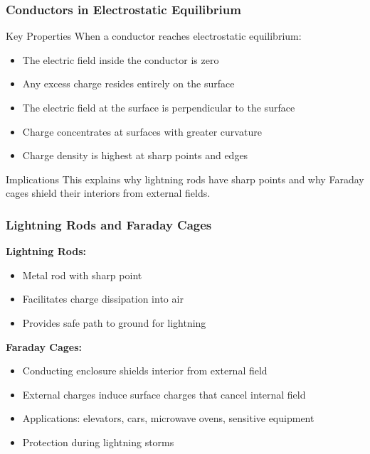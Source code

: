 \documentclass{beamer}
\newcommand{\highlight}[1]{\textcolor{ds9red}{#1}}
\begin{document}
\begin{frame}
    \frametitle{Conductors in Electrostatic Equilibrium}
    
    \begin{block}{Key Properties}
        When a conductor reaches electrostatic equilibrium:
    \end{block}
    
    \begin{itemize}
        \item The electric field \highlight{inside} the conductor is \highlight{zero}
        \item Any excess charge resides \highlight{entirely on the surface}
        \item The electric field at the surface is \highlight{perpendicular} to the surface
        \item Charge concentrates at surfaces with greater \highlight{curvature}
        \item Charge density is highest at \highlight{sharp points} and edges
    \end{itemize}
    
    \begin{alertblock}{Implications}
        This explains why lightning rods have sharp points and why Faraday cages shield their interiors from external fields.
    \end{alertblock}
\end{frame}

\begin{frame}
    \frametitle{Lightning Rods and Faraday Cages}
    
    \textbf{Lightning Rods:}
    \begin{itemize}
        \item Metal rod with \highlight{sharp point}
        \item Facilitates charge \highlight{dissipation} into air
        \item Provides safe path to ground for lightning
    \end{itemize}
    
    \vspace{0.5em}
    \textbf{Faraday Cages:}
    \begin{itemize}
        \item Conducting enclosure shields interior from external field
        \item External charges induce surface charges that \highlight{cancel} internal field
        \item Applications: elevators, cars, microwave ovens, sensitive equipment
        \item \highlight{Protection} during lightning storms
    \end{itemize}
\end{frame}
\end{document}
